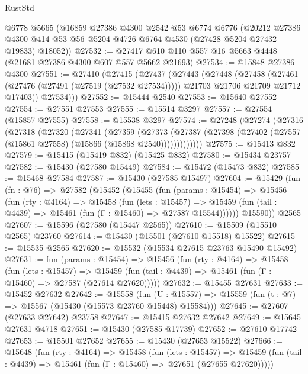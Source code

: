 \begin{lexlean}{RustStd}
\begin{coremodule}
{\begin{coremodule}
{{{{{{{{{{{{{{{{{{{{{{{{{{{{{{{{{{{{{{{{{{{{{{{{{{{{{{{{{{{{    @6778
    @5665
    (@16859
      @27386
      @4300
      @2542
      @53
      @6774
      @6776
      (@20212
        @27386
        @4300
        @414
        @53
        @56
        @5204
        @4726
        @6764
        @4530
        (@27428 @5204 @27432 @19833)
        @18052))
@27532 := @27417 @610 @110 @557 @16 @5663 @4448 (@21681 @27386 @4300 @607 @557 @5662 @21693)
@27534 := @15848 @27386 @4300
@27551 := @27410
    (@27415
      (@27437
        (@27443
          (@27448
            (@27458
              (@27461 (@27476 (@27491 (@27519 (@27532 @27534)))))
              @21703
              @21706
              @21709
              @21712
              @17403))
          @27534)))
@27552 := @15444 @2540
@27553 := @15640 @27552
@27554 := @27551 @27553
@27555 := @15514 @3297
@27557 := @27554 (@15857 @27555)
@27558 := @15538 @3297
@27574 := @27248
    (@27274
      (@27316
        (@27318
          (@27320
            (@27341
              (@27359
                (@27373
                  (@27387 (@27398 (@27402 (@27557 (@15861 @27558) (@15866 (@15868 @2540)))))))))))))
@27575 := @15413 @832
@27579 := @15415 (@15419 @832) (@15425 @832)
@27580 := @15434 @23757
@27582 := @15430 (@27580 @15449)
@27584 := @15472 (@15473 @832)
@27585 := @15468 @27584
@27587 := @15430 (@27585 @15497)
@27604 := @15429
    (fun (fn : @76) =>
    @27582
      (@15452
        (@15455
          (fun (params : @15454) =>
          @15456
            (fun (rty : @4164) =>
            @15458
              (fun (lets : @15457) =>
              @15459 (fun (tail : @4439) => @15461 (fun (Γ : @15460) => @27587 @15544))))))
        @15590))
    @2565
@27607 := @15596 (@27580 (@15447 @2565))
@27610 := @15509 (@15510 @2565) @23760
@27614 := @15430 (@15501 (@27610 @15518) @15522)
@27615 := @15535 @2565
@27620 := @15532 (@15534 @27615 @23763 @15490 @15492)
@27631 := fun (params : @15454) =>
  @15456
    (fun (rty : @4164) =>
    @15458
      (fun (lets : @15457) =>
      @15459 (fun (tail : @4439) => @15461 (fun (Γ : @15460) => @27587 (@27614 @27620)))))
@27632 := @15455 @27631
@27633 := @15452 @27632
@27642 := @15558
    (fun (U : @15557) => @15559 (fun (t : @7) => @15567 (@15430 (@15573 @23760 @15448) @15584)))
@27645 := @27607 (@27633 @27642) @23758
@27647 := @15415 @27632 @27642
@27649 := @15645 @27631 @4718
@27651 := @15430 (@27585 @17739)
@27652 := @27610 @17742
@27653 := @15501 @27652
@27655 := @15430 (@27653 @15522)
@27666 := @15648
    (fun (rty : @4164) =>
    @15458
      (fun (lets : @15457) =>
      @15459 (fun (tail : @4439) => @15461 (fun (Γ : @15460) => @27651 (@27655 @27620)))))
}}}}}}}}}}}}}}}}}}}}}}}}}}}}}}}}}}}}}}}}}}}}}}}}}}}}}}}}}}}}
\end{coremodule}}
\end{coremodule}
\end{lexlean}
